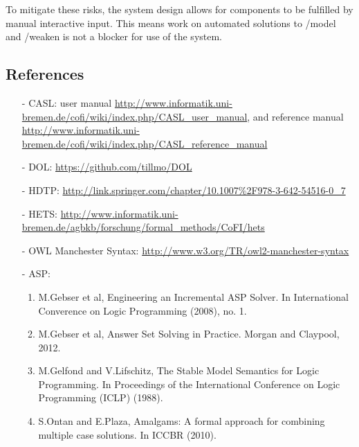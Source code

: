To mitigate these risks, the system design allows for components to be fulfilled by manual interactive input. This means work on automated solutions to /model and /weaken is not a blocker for use of the system.

\subsection{References}\label{sec:references}

\begin{itemize}
\item[-] CASL: user manual \url{http://www.informatik.uni-bremen.de/cofi/wiki/index.php/CASL_user_manual},
and reference manual \url{http://www.informatik.uni-bremen.de/cofi/wiki/index.php/CASL_reference_manual}
\item[-] DOL: \url{https://github.com/tillmo/DOL}
\item[-] HDTP: \url{http://link.springer.com/chapter/10.1007\%2F978-3-642-54516-0_7}
\item[-] HETS: \url{http://www.informatik.uni-bremen.de/agbkb/forschung/formal_methods/CoFI/hets}
\item[-] OWL Manchester Syntax: \url{http://www.w3.org/TR/owl2-manchester-syntax}
\item[-] ASP:
\begin{enumerate}
	\item M.Gebser et al, Engineering an Incremental ASP Solver. In International Converence on Logic Programming (2008), no. 1.
	\item M.Gebser et al, Answer Set Solving in Practice. Morgan and Claypool, 2012.
	\item M.Gelfond and V.Lifschitz, The Stable Model Semantics for Logic Programming.
In Proceedings of the International Conference on Logic Programming (ICLP) (1988).
	\item S.Ontan and E.Plaza, Amalgams: A formal approach for combining multiple case
solutions. In ICCBR (2010).
\end{enumerate}
\end{itemize}

